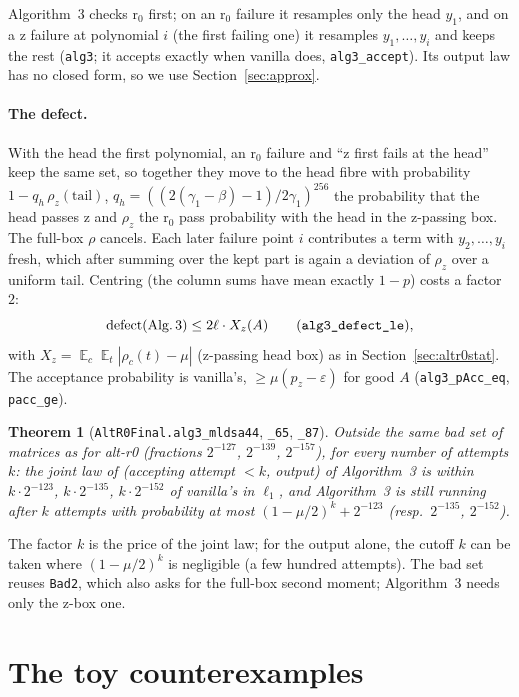 \documentclass[11pt]{article}
\newtheorem{theorem}{Theorem}
\theoremstyle{definition}
\theoremstyle{remark}
\newcommand{\lean}[1]{\texttt{#1}}
\begin{document}
Algorithm~3 checks r$_0$ first; on an r$_0$ failure it resamples only the head $y_1$, and on a
z failure at polynomial $i$ (the first failing one) it resamples $y_1,\dots,y_i$ and keeps the
rest (\lean{alg3}; it accepts exactly when vanilla does, \lean{alg3\_accept}). Its output law has
no closed form, so we use Section~\ref{sec:approx}.

\paragraph{The defect.} With the head the first polynomial, an r$_0$ failure and ``z first fails
at the head'' keep the same set, so together they move to the head fibre with probability
$1 - q_h\,\rho_z(\text{tail})$, $q_h = ((2(\gamma_1-\beta)-1)/2\gamma_1)^{256}$ the probability that the head passes z
and $\rho_z$ the r$_0$ pass probability with the head in the z-passing box. The full-box $\rho$
cancels. Each later failure point $i$ contributes a term with $y_2,\dots,y_i$ fresh, which after
summing over the kept part is again a deviation of $\rho_z$ over a uniform tail. Centring (the
column sums have mean exactly $1-p$) costs a factor $2$:
\[
  \mathrm{defect}(\text{Alg.\,3}) \le 2\ell\cdot X_z(A)
  \qquad(\lean{alg3\_defect\_le}),
\]
with $X_z = \mathop{\mathbb E}_c\mathop{\mathbb E}_t|\rho_{c}(t) - \mu|$ (z-passing head box) as in
Section~\ref{sec:altr0stat}. The acceptance probability is vanilla's, $\ge \mu(p_z - \varepsilon)$
for good $A$ (\lean{alg3\_pAcc\_eq}, \lean{pacc\_ge}).

\begin{theorem}[\lean{AltR0Final.alg3\_mldsa44}, \lean{\_65}, \lean{\_87}]
Outside the same bad set of matrices as for alt-r0 (fractions $2^{-127}$, $2^{-139}$, $2^{-157}$),
for every number of attempts $k$: the joint law of (accepting attempt $< k$, output) of
Algorithm~3 is within $k\cdot 2^{-123}$, $k\cdot 2^{-135}$, $k\cdot 2^{-152}$ of vanilla's in
$\ell_1$, and Algorithm~3 is still running after $k$ attempts with probability at most
$(1-\mu/2)^k + 2^{-123}$ (resp.\ $2^{-135}$, $2^{-152}$).
\end{theorem}

The factor $k$ is the price of the joint law; for the output alone, the cutoff $k$ can be taken
where $(1-\mu/2)^k$ is negligible (a few hundred attempts). The bad set reuses \lean{Bad2}, which
also asks for the full-box second moment; Algorithm~3 needs only the z-box one.

\section{The toy counterexamples}\label{sec:toy}
\end{document}

